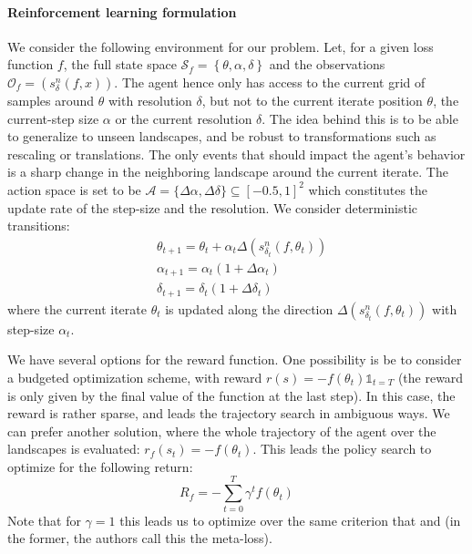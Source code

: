 		\paragraph{Reinforcement learning formulation} We consider the following environment for our problem. Let, for a given loss function $f$, the full state space $\mathcal{S}_f = \left\{ \theta, \alpha, \delta \right\}$ and the observations $\mathcal{O}_f = \left( s_\delta^n(f,x) \right)$. The agent hence only has access to the current grid of samples around $\theta$ with resolution $\delta$, but not to the current iterate position $\theta$, the current-step size $\alpha$ or the current resolution $\delta$. The idea behind this is to be able to generalize to unseen landscapes, and be robust to transformations such as rescaling or translations. The only events that should impact the agent's behavior is a sharp change in the neighboring landscape around the current iterate. The action space is set to be $\mathcal{A} = \{ \Delta \alpha , \Delta \delta \}\subseteq [-0.5,1]^2$ which constitutes the update rate of the step-size and the resolution. We consider deterministic transitions:
			\begin{equation}
				\begin{aligned}
					&\theta_{t+1} = \theta_{t} + \alpha_t \Delta(s_{\delta_t}^n(f,\theta_t)) \\
					&\alpha_{t+1} = \alpha_t(1+\Delta \alpha_t) \\
					&\delta_{t+1} = \delta_t(1+\Delta\delta_t)
				\end{aligned}
				\label{eq::transitions}
			\end{equation}
			where the current iterate $\theta_t$ is updated along the direction $\Delta(s_{\delta_t}^n(f,\theta_t))$ with step-size $\alpha_t$. 
			
			We have several options for the reward function. One possibility is be to consider a budgeted optimization scheme, with reward $r(s) = -f(\theta_t) \mathds{1}_{t=T}$ (the reward is only given by the final value of the function at the last step). In this case, the reward is rather sparse, and leads the trajectory search in ambiguous ways. We can prefer another solution, where the whole trajectory of the agent over the landscapes is evaluated: $ r_f(s_t) = -f(\theta_t)$. 
			This leads the policy search to optimize for the following return:
			\begin{equation}
				R_f = -\sum_{t=0}^T \gamma^t f(\theta_t)
				\label{eq::reward}
			\end{equation}	
			Note that for $\gamma = 1$ this leads us to optimize over the same criterion that \cite{li2017learning} and \cite{andrychowicz2016learning} (in the former, the authors call this the meta-loss). 
			

